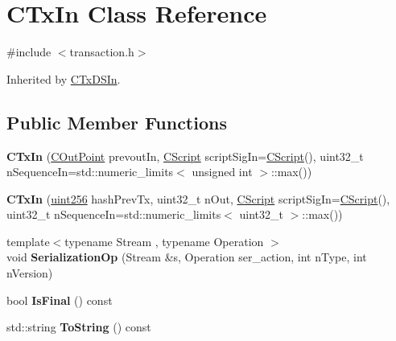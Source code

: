 \hypertarget{class_c_tx_in}{}\section{C\+Tx\+In Class Reference}
\label{class_c_tx_in}


{\ttfamily \#include $<$transaction.\+h$>$}



Inherited by \mbox{\hyperlink{class_c_tx_d_s_in}{C\+Tx\+D\+S\+In}}.

\subsection*{Public Member Functions}
\begin{DoxyCompactItemize}
\item 
\mbox{\label{class_c_tx_in_a200599abad3a0f0b92edbf74c4b2ab5d}} 
{\bfseries C\+Tx\+In} (\mbox{\hyperlink{class_c_out_point}{C\+Out\+Point}} prevout\+In, \mbox{\hyperlink{class_c_script}{C\+Script}} script\+Sig\+In=\mbox{\hyperlink{class_c_script}{C\+Script}}(), uint32\+\_\+t n\+Sequence\+In=std\+::numeric\+\_\+limits$<$ unsigned int $>$\+::max())
\item 
\mbox{\label{class_c_tx_in_a09a783aad555111a108f09ac79361c4a}} 
{\bfseries C\+Tx\+In} (\mbox{\hyperlink{classuint256}{uint256}} hash\+Prev\+Tx, uint32\+\_\+t n\+Out, \mbox{\hyperlink{class_c_script}{C\+Script}} script\+Sig\+In=\mbox{\hyperlink{class_c_script}{C\+Script}}(), uint32\+\_\+t n\+Sequence\+In=std\+::numeric\+\_\+limits$<$ uint32\+\_\+t $>$\+::max())
\item 
\mbox{\label{class_c_tx_in_a3d23c5264c6d93ecf3cf65dd13c55db3}} 
{\footnotesize template$<$typename Stream , typename Operation $>$ }\\void {\bfseries Serialization\+Op} (Stream \&s, Operation ser\+\_\+action, int n\+Type, int n\+Version)
\item 
\mbox{\label{class_c_tx_in_ae6629ccc2720f2b772b0cc2d7f3fe42b}} 
bool {\bfseries Is\+Final} () const
\item 
\mbox{\label{class_c_tx_in_a9f3dcba8a979ca7007448f8ad1d3c4c1}} 
std\+::string {\bfseries To\+String} () const
\end{DoxyCompactItemize}
